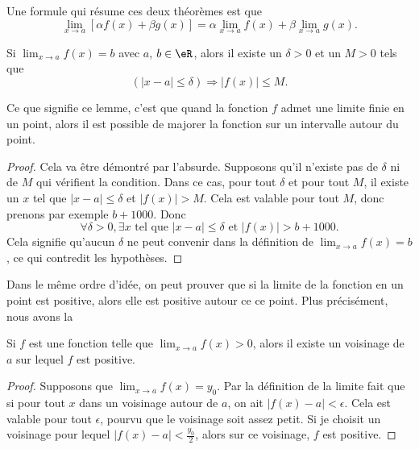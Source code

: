 Une formule qui résume ces deux théorèmes est que
\begin{equation}    \label{EqLimLinRes}
    \lim_{x\to a}[\alpha f(x)+\beta g(x)]=\alpha\lim_{x\to a}f(x)+\beta\lim_{x\to a}g(x).
\end{equation}

\begin{lemma}       \label{LemLimMajorableVois}
    Si $\lim_{x\to a}f(x)=b$ avec $a$, $b\in\eR$, alors il existe un $\delta>0$ et un $M>0$ tels que 
    \[ 
        (| x-a |\leq\delta)\Rightarrow | f(x) |\leq M.
    \]

\end{lemma}

Ce que signifie ce lemme, c'est que quand la fonction $f$ admet une limite finie en un point, alors il est possible de majorer la fonction sur un intervalle autour du point.

\begin{proof}
    Cela va être démontré par l'absurde. Supposons qu'il n'existe pas de $\delta$ ni de $M$ qui vérifient la condition. Dans ce cas, pour tout $\delta$ et pour tout $M$, il existe un $x$ tel que $| x-a |\leq\delta$ et $| f(x) |> M$. Cela est valable pour tout $M$, donc prenons par exemple $b+1000$. Donc 
    \begin{equation}
    \forall\delta>0,\exists x\text{ tel que } | x-a |\leq\delta\text{ et }| f(x) |>b+1000.
    \end{equation}
    Cela signifie qu'aucun $\delta$ ne peut convenir dans la définition de $\lim_{x\to a}f(x)=b$, ce qui contredit les hypothèses.
\end{proof}

Dans le même ordre d'idée, on peut prouver que si la limite de la fonction en un point est positive, alors elle est positive autour ce ce point. Plus précisément, nous avons la
\begin{proposition} \label{PropoLimPosFPos}
    Si $f$ est une fonction telle que $\lim_{x\to a}f(x)>0$, alors il existe un voisinage de $a$ sur lequel $f$ est positive.
\end{proposition}   

\begin{proof}
    Supposons que $\lim_{x\to a}f(x)=y_0$. Par la définition de la limite fait que si pour tout $x$ dans un voisinage autour de $a$, on ait $| f(x)-a |<\epsilon$. Cela est valable pour tout $\epsilon$, pourvu que le voisinage soit assez petit. Si je choisit un voisinage pour lequel $| f(x)-a |<\frac{ y_0 }{ 2 }$, alors sur ce voisinage, $f$ est positive.
\end{proof}


